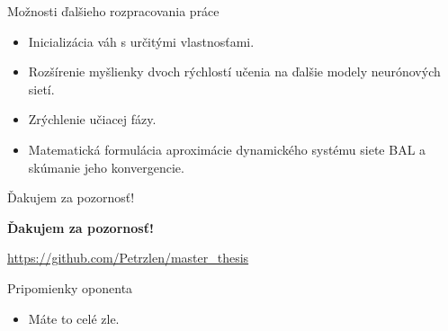 \documentclass[xcolor=dvipsnames]{beamer}
\begin{document}
\begin{frame}{Možnosti ďalšieho rozpracovania práce}
  \begin{itemize} 
    \item Inicializácia váh s určitými vlastnosťami.
    \item Rozšírenie myšlienky dvoch rýchlostí učenia na ďalšie modely neurónových sietí.  
    \item Zrýchlenie učiacej fázy. 
    \item Matematická formulácia aproximácie dynamického systému siete BAL a skúmanie jeho konvergencie. 
  \end{itemize} 
\end{frame} 

\begin{frame}{Ďakujem za pozornosť!}
  \begin{center}
{\bf Ďakujem za pozornosť!} 
  \end{center}
  
  \vspace{2cm}
  
  \begin{center}
  \url{https://github.com/Petrzlen/master_thesis} \\
  \vspace{5mm} 
  \end{center}
\end{frame}

\begin{frame}{Pripomienky oponenta}
  \begin{itemize} 
    \item Máte to celé zle. 
  \end{itemize} 
\end{frame} 
\end{document}
